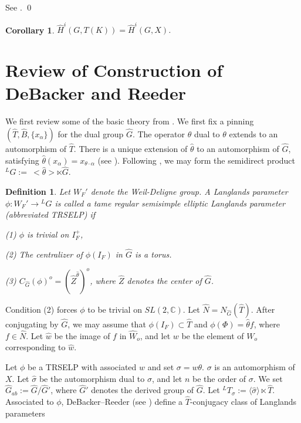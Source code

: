 \documentclass[11pt]{amsart}
\theoremstyle{plain}
\newtheorem{corollary}[enumi]{Corollary}
\newtheorem{definition}[enumi]{Definition}
\begin{document}
\proof
See \cite[Theorem 3]{amano}.
\qed

\begin{corollary}
$\hat{H}^i(G, T(K)) = \hat{H}^i(G,X)$.
\end{corollary}

\section{Review of Construction of DeBacker and Reeder}\label{preliminaries}

We first review some of the basic theory from \cite{debackerreeder}.  We first fix a pinning $(\hat{T}, \hat{B}, \{x_{\alpha} \})$ for the dual group $\hat{G}$.  The operator $\hat{\theta}$ dual to $\theta$ extends to an automorphism of $\hat{T}$.  There is a unique extension of $\hat{\theta}$ to an automorphism of $\hat{G}$, satisfying $\hat{\theta}(x_{\alpha}) = x_{\theta \cdot \alpha}$ (see \cite[section 3.2]{debackerreeder}).  Following \cite{debackerreeder}, we may form the semidirect product ${}^L G := \ <\hat{\theta}> \ltimes \hat{G}$.

\begin{definition}
Let $W_F'$ denote the Weil-Deligne group.  A Langlands parameter $\phi : W_F' \rightarrow {}^L G$ is called a \emph{tame regular semisimple elliptic Langlands parameter} (abbreviated TRSELP) if

(1) $\phi$ is trivial on $I_F^+$,

(2) The centralizer of $\phi(I_F)$ in $\hat{G}$ is a torus.

(3) $C_{\hat{G}}(\phi)^o = (\hat{Z}^{\hat{\theta}})^o$, where $\hat{Z}$ denotes the center of $\hat{G}$.
\end{definition}

Condition (2) forces $\phi$ to be trivial on $SL(2,\mathbb{C})$.  Let $\hat{N} = N_{\hat{G}}(\hat{T})$.  After conjugating by $\hat{G}$, we may assume that $\phi(I_F) \subset \hat{T}$ and $\phi(\Phi) = \hat{\theta} f$, where $f \in \hat{N}$.  Let $\hat{w}$ be the image of $f$ in $\hat{W}_o$, and let $w$ be the element of $W_o$ corresponding to $\hat{w}$.

Let $\phi$ be a TRSELP with associated $w$ and set $\sigma = w \theta$. $\sigma$ is an automorphism of $X$.  Let $\hat{\sigma}$ be the automorphism dual to $\sigma$, and let $n$ be the order of $\sigma$.  We set $\hat{G}_{ab} := \hat{G} / \hat{G}'$, where $\hat{G}'$ denotes the derived group of $\hat{G}$. Let ${}^L T_{\sigma} := \langle \hat{\sigma} \rangle \ltimes \hat{T}$.  Associated to $\phi$, DeBacker--Reeder (see \cite[Chapter 4]{debackerreeder}) define a $\hat{T}$-conjugacy class of Langlands parameters
\end{document}
